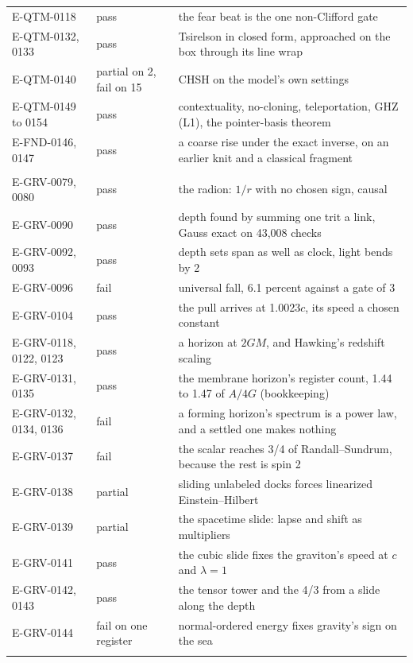 \begin{small}
\begin{longtable}{@{}>{\raggedright\arraybackslash}p{3.4cm}>{\raggedright\arraybackslash}p{2.2cm}p{9.3cm}@{}}
E-QTM-0118 & pass & the fear beat is the one non-Clifford gate \\
E-QTM-0132, 0133 & pass & Tsirelson in closed form, approached on the box through its line wrap \\
E-QTM-0140 & partial on 2, fail on 15 & CHSH on the model's own settings \\
E-QTM-0149 to 0154 & pass & contextuality, no-cloning, teleportation, GHZ (L1), the pointer-basis theorem \\
E-FND-0146, 0147 & pass & a coarse rise under the exact inverse, on an earlier knit and a classical fragment \\
\multicolumn{3}{@{}l}{\emph{Gravity}} \\
E-GRV-0079, 0080 & pass & the radion: $1/r$ with no chosen sign, causal \\
E-GRV-0090 & pass & depth found by summing one trit a link, Gauss exact on 43,008 checks \\
E-GRV-0092, 0093 & pass & depth sets span as well as clock, light bends by 2 \\
E-GRV-0096 & fail & universal fall, 6.1 percent against a gate of 3 \\
E-GRV-0104 & pass & the pull arrives at 1.0023$c$, its speed a chosen constant \\
E-GRV-0118, 0122, 0123 & pass & a horizon at $2GM$, and Hawking's redshift scaling \\
E-GRV-0131, 0135 & pass & the membrane horizon's register count, 1.44 to 1.47 of $A/4G$ (bookkeeping) \\
E-GRV-0132, 0134, 0136 & fail & a forming horizon's spectrum is a power law, and a settled one makes nothing \\
E-GRV-0137 & fail & the scalar reaches 3/4 of Randall--Sundrum, because the rest is spin 2 \\
E-GRV-0138 & partial & sliding unlabeled docks forces linearized Einstein--Hilbert \\
E-GRV-0139 & partial & the spacetime slide: lapse and shift as multipliers \\
E-GRV-0141 & pass & the cubic slide fixes the graviton's speed at $c$ and $\lambda = 1$ \\
E-GRV-0142, 0143 & pass & the tensor tower and the 4/3 from a slide along the depth \\
E-GRV-0144 & fail on one register & normal-ordered energy fixes gravity's sign on the sea \\
\multicolumn{3}{@{}l}{\emph{Motion}} \\

\end{longtable}
\end{small}
